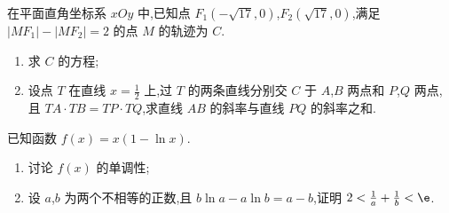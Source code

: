 \begin{problem}
在平面直角坐标系 \(xOy\) 中,已知点 \(F_1(-\sqrt{17},0)\),\(F_2(\sqrt{17},0)\),满足 \(|MF_1|-|MF_2|=2\) 的点 \(M\) 的轨迹为 \(C\).

\begin{enumerate}
\item 求 \(C\) 的方程;
\item 设点 \(T\) 在直线 \(x=\frac{1}{2}\) 上,过 \(T\) 的两条直线分别交 \(C\) 于 \(A\),\(B\) 两点和 \(P\),\(Q\) 两点,且 \(TA\cdot TB=TP\cdot TQ\),求直线 \(AB\) 的斜率与直线 \(PQ\) 的斜率之和.
\end{enumerate}
\end{problem}

\begin{problem}
已知函数 \(f(x)=x\left( 1-\ln x \right)\).

\begin{enumerate}
\item 讨论 \(f(x)\) 的单调性;
\item 设 \(a\),\(b\) 为两个不相等的正数,且 \(b\ln a-a\ln b=a-b\),证明 \(2<\frac{1}{a}+\frac{1}{b}<\e\).
\end{enumerate}
\end{problem}

